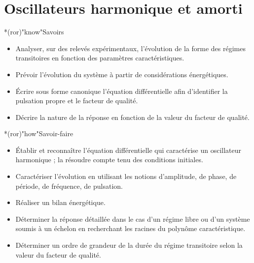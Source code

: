 \documentclass[../../main/main.tex]{subfiles}
\begin{document}
\setcounter{chapter}{3}

\chapter{Oscillateurs harmonique et amorti}

\vfill

\begin{prgm}
	\begin{tcb}*(ror)"know"{Savoirs}
		\begin{itemize}[label=$\diamond$, leftmargin=10pt]
			\item Analyser, sur des relevés expérimentaux, l’évolution de la forme des
			      régimes transitoires en fonction des paramètres caractéristiques.
			\item Prévoir l’évolution du système à partir de considérations
			      énergétiques.
			\item Écrire sous forme canonique l’équation différentielle afin
			      d’identifier la pulsation propre et le facteur de qualité.
			\item Décrire la nature de la réponse en fonction de la valeur du facteur
			      de qualité.
		\end{itemize}
	\end{tcb}

	\begin{tcb}*(ror)"how"{Savoir-faire}
		\begin{itemize}[label=$\diamond$, leftmargin=10pt]
			\item Établir et reconnaître l’équation différentielle qui caractérise un
			      oscillateur harmonique ; la résoudre compte tenu des conditions
			      initiales.
			\item Caractériser l’évolution en utilisant les notions d’amplitude, de
			      phase, de période, de fréquence, de pulsation.
			\item Réaliser un bilan énergétique.
			\item Déterminer la réponse détaillée dans le cas d’un régime libre ou
			      d’un système soumis à un échelon en recherchant les racines du
			      polynôme caractéristique.
			\item Déterminer un ordre de grandeur de la durée du régime transitoire
			      selon la valeur du facteur de qualité.
		\end{itemize}
	\end{tcb}
\end{prgm}

\vfill
\minitoc
\vfill
\end{document}
